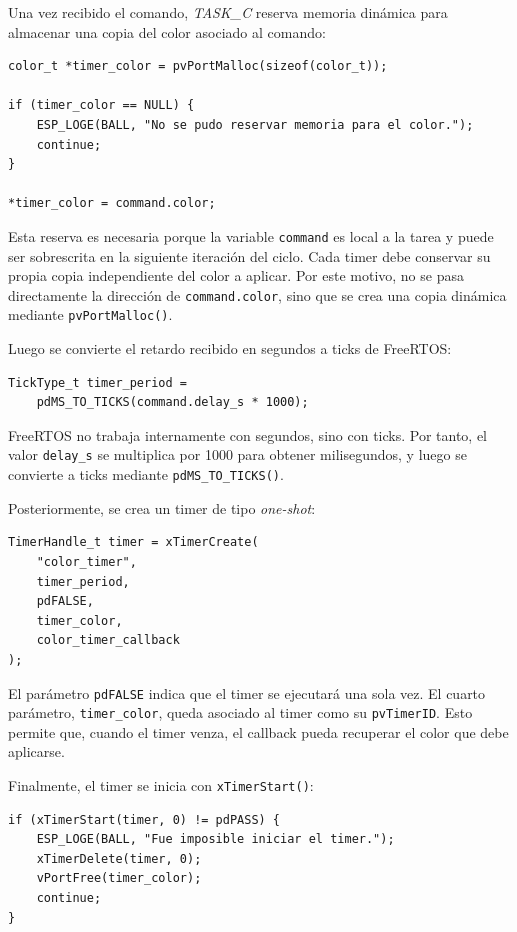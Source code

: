 \documentclass[12pt,letterpaper]{article}
\begin{document}
Una vez recibido el comando, \textit{TASK\_C} reserva memoria dinámica para almacenar una copia del color asociado al comando:

\begin{lstlisting}
color_t *timer_color = pvPortMalloc(sizeof(color_t));

if (timer_color == NULL) {
    ESP_LOGE(BALL, "No se pudo reservar memoria para el color.");
    continue;
}

*timer_color = command.color;
\end{lstlisting}

Esta reserva es necesaria porque la variable \texttt{command} es local a la tarea y puede ser sobrescrita en la siguiente iteración del ciclo. Cada timer debe conservar su propia copia independiente del color a aplicar. Por este motivo, no se pasa directamente la dirección de \texttt{command.color}, sino que se crea una copia dinámica mediante \texttt{pvPortMalloc()}.

Luego se convierte el retardo recibido en segundos a ticks de FreeRTOS:

\begin{lstlisting}
TickType_t timer_period =
    pdMS_TO_TICKS(command.delay_s * 1000);
\end{lstlisting}

FreeRTOS no trabaja internamente con segundos, sino con ticks. Por tanto, el valor \texttt{delay\_s} se multiplica por 1000 para obtener milisegundos, y luego se convierte a ticks mediante \texttt{pdMS\_TO\_TICKS()}.

Posteriormente, se crea un timer de tipo \textit{one-shot}:

\begin{lstlisting}
TimerHandle_t timer = xTimerCreate(
    "color_timer",
    timer_period,
    pdFALSE,
    timer_color,
    color_timer_callback
);
\end{lstlisting}

El parámetro \texttt{pdFALSE} indica que el timer se ejecutará una sola vez. El cuarto parámetro, \texttt{timer\_color}, queda asociado al timer como su \texttt{pvTimerID}. Esto permite que, cuando el timer venza, el callback pueda recuperar el color que debe aplicarse.

Finalmente, el timer se inicia con \texttt{xTimerStart()}:

\begin{lstlisting}
if (xTimerStart(timer, 0) != pdPASS) {
    ESP_LOGE(BALL, "Fue imposible iniciar el timer.");
    xTimerDelete(timer, 0);
    vPortFree(timer_color);
    continue;
}
\end{lstlisting}
\end{document}
